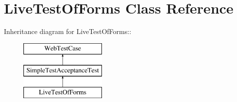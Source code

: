 \hypertarget{class_live_test_of_forms}{
\section{LiveTestOfForms Class Reference}
\label{class_live_test_of_forms}
}
Inheritance diagram for LiveTestOfForms::\begin{figure}[H]
\begin{center}
\leavevmode
\includegraphics[height=3cm]{class_live_test_of_forms}
\end{center}
\end{figure}
